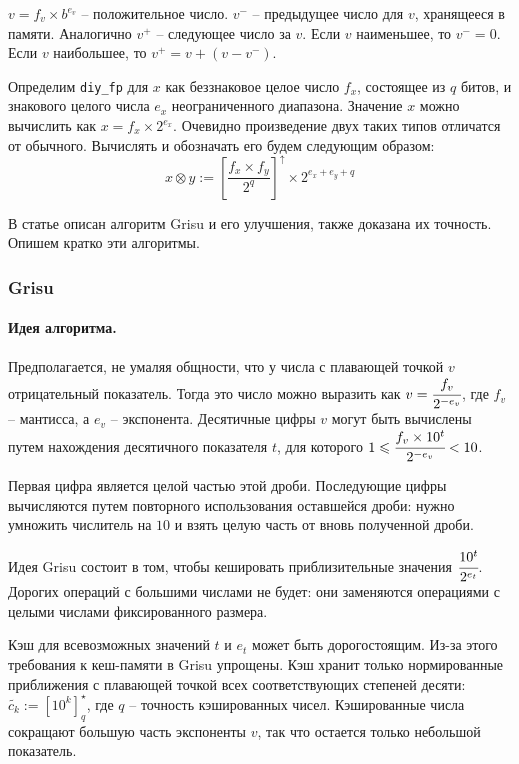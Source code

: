 \documentclass[a4paper, 12pt, twoside]{article}
\begin{document}
$v=f_v \times b^{e_v}$ -- положительное число.
$v^{-}$ -- предыдущее число для $v$, хранящееся в памяти.
Аналогично $v^{+}$ -- следующее число за $v$.
Если $v$ наименьшее, то $v^{-} = 0$.
Если $v$ наибольшее, то $v^{+} = v + (v - v^{-})$.


Определим \texttt{diy\_fp} для $x$ как беззнаковое целое число $f_x$, состоящее из $q$ битов, и знакового целого числа $e_x$ неограниченного диапазона. 
Значение $x$ можно вычислить как $x= f_x \times 2^{e_x}$.
Очевидно произведение двух таких типов отличатся от обычного.
Вычислять и обозначать его будем следующим образом:
$$x \otimes y := \left[ \frac{f_x \times f_y}{2^q}\right]^\uparrow \times 2^{e_x+e_y+q}$$

В статье \cite{1} описан алгоритм \textsf{Grisu} и его улучшения, также доказана их точность.
Опишем кратко эти алгоритмы.
\subsubsection{\textsf{Grisu}}
\paragraph{Идея алгоритма.}
Предполагается, не умаляя общности, что у числа с плавающей точкой $v$ отрицательный показатель. 
Тогда это число можно выразить как $v=\cfrac{f_v}{2^{-e_v}}$, где $f_v$ -- мантисса, а $e_v$ -- экспонента. 
Десятичные цифры $v$ могут быть вычислены путем нахождения десятичного показателя $t$, для которого $1 \leqslant \cfrac{f_v \times 10^t}{2^{-e_v}} < 10$.

Первая цифра является целой частью этой дроби. 
Последующие цифры вычисляются путем повторного использования оставшейся дроби: нужно умножить числитель на $10$ и взять целую часть от вновь полученной дроби.

Идея \textsf{Grisu} состоит в том, чтобы кешировать приблизительные значения $\cfrac{10^t}{2^{e_t}}$.
Дорогих операций с большими числами не будет: они заменяются операциями с целыми числами фиксированного размера.

Кэш для всевозможных значений $t$ и $e_t$ может быть дорогостоящим. 
Из-за этого требования к кеш-памяти в \textsf{Grisu} упрощены. 
Кэш хранит только нормированные приближения с плавающей точкой всех соответствующих степеней десяти: $\tilde{c_k} := \left[ 10^k \right]_q^{\star}$, где $q$ -- точность кэшированных чисел.
Кэшированные числа сокращают большую часть экспоненты $v$, так что остается только небольшой показатель. 
\end{document}

